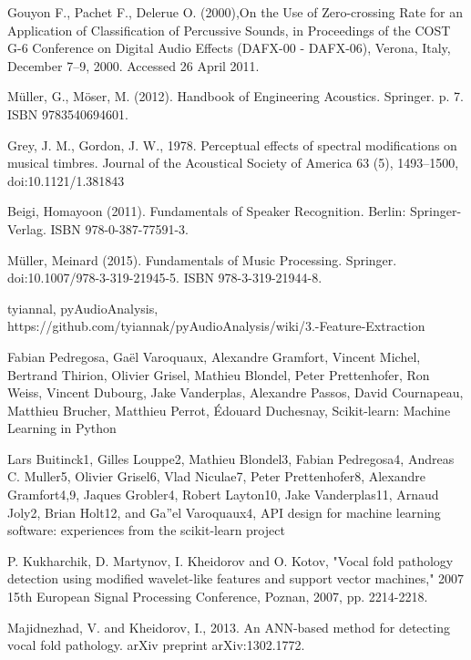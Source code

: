 \documentclass[conference]{IEEEtran}
\begin{document}
\begin{thebibliography}{00}
	
 Gouyon F., Pachet F., Delerue O. (2000),On the Use of Zero-crossing Rate for an Application of Classification of Percussive Sounds, in Proceedings of the COST G-6 Conference on Digital Audio Effects (DAFX-00 - DAFX-06), Verona, Italy, December 7–9, 2000. Accessed 26 April 2011.

Müller, G., Möser, M. (2012). Handbook of Engineering Acoustics. Springer. p. 7. ISBN 9783540694601.

Grey, J. M., Gordon, J. W., 1978. Perceptual effects of spectral modifications on musical timbres. Journal of the Acoustical Society of America 63 (5), 1493–1500, doi:10.1121/1.381843

Beigi, Homayoon (2011). Fundamentals of Speaker Recognition. Berlin: Springer-Verlag. ISBN 978-0-387-77591-3.

Müller, Meinard (2015). Fundamentals of Music Processing. Springer. doi:10.1007/978-3-319-21945-5. ISBN 978-3-319-21944-8.

tyiannal, pyAudioAnalysis, https://github.com/tyiannak/pyAudioAnalysis/wiki/3.-Feature-Extraction

Fabian Pedregosa, Gaël Varoquaux, Alexandre Gramfort, Vincent Michel, Bertrand Thirion, Olivier Grisel, Mathieu Blondel, Peter Prettenhofer, Ron Weiss, Vincent Dubourg, Jake Vanderplas, Alexandre Passos, David Cournapeau, Matthieu Brucher, Matthieu Perrot, Édouard Duchesnay, Scikit-learn: Machine Learning in Python

Lars Buitinck1, Gilles Louppe2, Mathieu Blondel3, Fabian Pedregosa4, Andreas C. Muller5, Olivier Grisel6, Vlad Niculae7, Peter Prettenhofer8, Alexandre Gramfort4,9, Jaques Grobler4, Robert Layton10, Jake Vanderplas11, Arnaud Joly2, Brian Holt12, and Ga''el Varoquaux4, API design for machine learning software: experiences from the scikit-learn project

P. Kukharchik, D. Martynov, I. Kheidorov and O. Kotov, "Vocal fold pathology detection using modified wavelet-like features and support vector machines," 2007 15th European Signal Processing Conference, Poznan, 2007, pp. 2214-2218.

Majidnezhad, V. and Kheidorov, I., 2013. An ANN-based method for detecting vocal fold pathology. arXiv preprint arXiv:1302.1772.


\end{thebibliography}
\end{document}
